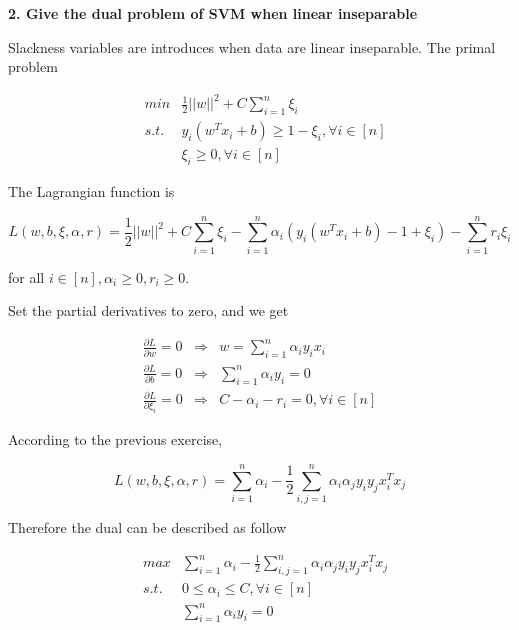 \documentclass[UTF8]{ctexart}
\begin{document}
\vspace{10pt}
\textbf{2. Give the dual problem of SVM when linear inseparable}\par
Slackness variables are introduces when data are linear inseparable. The primal problem\par
\begin{eqnarray*}
 &min&\frac{1}{2}||w||^{2}+C\sum_{i=1}^{n}\xi_{i}\\
&s.t.&y_{i}(w^{T}x_{i}+b)\geq 1-\xi_{i},\forall i\in[n]\\
& &\xi_{i}\geq 0,\forall i\in[n]
\end{eqnarray*}\par
The Lagrangian function is\par
\begin{equation*}
L(w,b,\xi,\alpha,r)=\frac{1}{2}||w||^{2}+C\sum_{i=1}^{n}\xi_{i}-\sum_{i=1}^{n}\alpha_{i}(y_{i}(w^{T}x_{i}+b)-1+\xi_{i})-\sum_{i=1}^{n}r_{i}\xi_{i}
\end{equation*}\par
for all $i\in[n],\alpha_{i}\geq 0,r_{i}\geq 0$.\par
Set the partial derivatives to zero, and we get\par
\begin{eqnarray*}
\frac{\partial L}{\partial w}=0&\Rightarrow&w=\sum_{i=1}^{n}\alpha_{i}y_{i}x_{i}\\
\frac{\partial L}{\partial b}=0&\Rightarrow&\sum_{i=1}^{n}\alpha_{i}y_{i}=0\\
\frac{\partial L}{\partial \xi_{i}}=0&\Rightarrow&C-\alpha_{i}-r_{i}=0,\forall i\in[n]
\end{eqnarray*}\par
According to the previous exercise,\par
\begin{equation*}
L(w,b,\xi,\alpha,r)=\sum_{i=1}^{n}\alpha_{i}-\frac{1}{2}\sum_{i,j=1}^{n}\alpha_{i}\alpha_{j}y_{i}y_{j}x_{i}^{T}x_{j}
\end{equation*}\par
Therefore the dual can be described as follow\par
\begin{eqnarray*}
 &max&\sum_{i=1}^{n}\alpha_{i}-\frac{1}{2}\sum_{i,j=1}^{n}\alpha_{i}\alpha_{j}y_{i}y_{j}x_{i}^{T}x_{j}\\
&s.t.&0\leq\alpha_{i}\leq C,\forall i\in[n]\\
& &\sum_{i=1}^{n}\alpha_{i}y_{i}=0
\end{eqnarray*}\par
\vspace{10pt}
\end{document}
